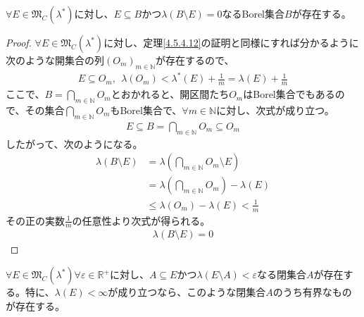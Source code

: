 \documentclass[dvipdfmx]{jsarticle}
\begin{document}
\begin{thm}\label{4.5.4.15}
$\forall E \in \mathfrak{M}_{C}\left( \lambda^{*} \right)$に対し、$E \subseteq B$かつ$\lambda(B \setminus E) = 0$なるBorel集合$B$が存在する。
\end{thm}
\begin{proof}
$\forall E \in \mathfrak{M}_{C}\left( \lambda^{*} \right)$に対し、定理\ref{4.5.4.12}の証明と同様にすれば分かるように次のような開集合の列$\left( O_{m} \right)_{m \in \mathbb{N}}$が存在するので、
\begin{align*}
E \subseteq O_{m},\ \ \lambda\left( O_{m} \right) < \lambda^{*}(E) + \frac{1}{m} = \lambda(E) + \frac{1}{m}
\end{align*}
ここで、$B = \bigcap_{m \in \mathbb{N}} O_{m}$とおかれると、開区間たち$O_{m}$はBorel集合でもあるので、その集合$\bigcap_{m \in \mathbb{N}} O_{m}$もBorel集合で、$\forall m \in \mathbb{N}$に対し、次式が成り立つ。
\begin{align*}
E \subseteq B = \bigcap_{m \in \mathbb{N}} O_{m} \subseteq O_{m}
\end{align*}
したがって、次のようになる。
\begin{align*}
\lambda(B \setminus E) &= \lambda\left( \bigcap_{m \in \mathbb{N}} O_{m} \setminus E \right)\\
&= \lambda\left( \bigcap_{m \in \mathbb{N}} O_{m} \right) - \lambda(E)\\
&\leq \lambda\left( O_{m} \right) - \lambda(E) < \frac{1}{m}
\end{align*}
その正の実数$\frac{1}{m}$の任意性より次式が得られる。
\begin{align*}
\lambda(B \setminus E) = 0
\end{align*}
\end{proof}
\begin{thm}\label{4.5.4.16}
$\forall E \in \mathfrak{M}_{C}\left( \lambda^{*} \right)\forall\varepsilon \in \mathbb{R}^{+}$に対し、$A \subseteq E$かつ$\lambda(E \setminus A) < \varepsilon$なる閉集合$A$が存在する。特に、$\lambda(E) < \infty$が成り立つなら、このような閉集合$A$のうち有界なものが存在する。
\end{thm}
\end{document}
